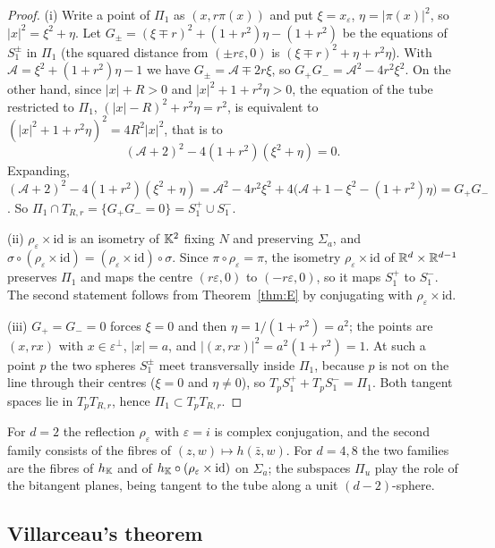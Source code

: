 \begin{proof}
(i) Write a point of $\Pi_1$ as $(x,r\pi(x))$ and put $\xi=x_\varepsilon$, $\eta=|\pi(x)|^2$, so $|x|^2=\xi^2+\eta$. Let $G_\pm=(\xi\mp r)^2+(1+r^2)\eta-(1+r^2)$ be the equations of $S_1^\pm$ in $\Pi_1$ (the squared distance from $(\pm r\varepsilon,0)$ is $(\xi\mp r)^2+\eta+r^2\eta$). With $\mathcal A=\xi^2+(1+r^2)\eta-1$ we have $G_\pm=\mathcal A\mp2r\xi$, so $G_+G_-=\mathcal A^2-4r^2\xi^2$. On the other hand, since $|x|+R>0$ and $|x|^2+1+r^2\eta>0$, the equation of the tube restricted to $\Pi_1$, $(|x|-R)^2+r^2\eta=r^2$, is equivalent to $(|x|^2+1+r^2\eta)^2=4R^2|x|^2$, that is to
\[
(\mathcal A+2)^2-4(1+r^2)(\xi^2+\eta)=0 .
\]
Expanding, $(\mathcal A+2)^2-4(1+r^2)(\xi^2+\eta)=\mathcal A^2-4r^2\xi^2+4\bigl(\mathcal A+1-\xi^2-(1+r^2)\eta\bigr)=G_+G_-$. So $\Pi_1\cap T_{R,r}=\{G_+G_-=0\}=S_1^+\cup S_1^-$.

(ii) $\rho_\varepsilon\times\mathrm{id}$ is an isometry of $\mathbb{K}^2$ fixing $N$ and preserving $\Sigma_a$, and $\sigma\circ(\rho_\varepsilon\times\mathrm{id})=(\rho_\varepsilon\times\mathrm{id})\circ\sigma$. Since $\pi\circ\rho_\varepsilon=\pi$, the isometry $\rho_\varepsilon\times\mathrm{id}$ of $\mathbb{R}^d\times\mathbb{R}^{d-1}$ preserves $\Pi_1$ and maps the centre $(r\varepsilon,0)$ to $(-r\varepsilon,0)$, so it maps $S_1^+$ to $S_1^-$. The second statement follows from Theorem~\ref{thm:E} by conjugating with $\rho_\varepsilon\times\mathrm{id}$.

(iii) $G_+=G_-=0$ forces $\xi=0$ and then $\eta=1/(1+r^2)=a^2$; the points are $(x,rx)$ with $x\in\varepsilon^\perp$, $|x|=a$, and $|(x,rx)|^2=a^2(1+r^2)=1$. At such a point $p$ the two spheres $S_1^\pm$ meet transversally inside $\Pi_1$, because $p$ is not on the line through their centres ($\xi=0$ and $\eta\neq0$), so $T_pS_1^++T_pS_1^-=\Pi_1$. Both tangent spaces lie in $T_pT_{R,r}$, hence $\Pi_1\subset T_pT_{R,r}$.
\end{proof}

For $d=2$ the reflection $\rho_\varepsilon$ with $\varepsilon=i$ is complex conjugation, and the second family consists of the fibres of $(z,w)\mapsto h(\bar z,w)$. For $d=4,8$ the two families are the fibres of $h_{\mathbb{K}}$ and of $h_{\mathbb{K}}\circ(\rho_\varepsilon\times\mathrm{id})$ on $\Sigma_a$; the subspaces $\Pi_u$ play the role of the bitangent planes, being tangent to the tube along a unit $(d-2)$-sphere.

\subsection{Villarceau's theorem}\label{sec:villarceau2}

